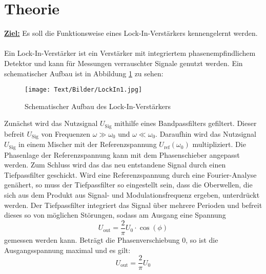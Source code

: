 \section{Theorie}

\textbf{\underline{Ziel:}}
Es soll die Funktionsweise eines Lock-In-Verstärkers kennengelernt werden.
\\
\\
Ein Lock-In-Verstärker ist ein Verstärker mit integriertem phasenempfindlichem Detektor und kann für
Messungen verrauschter Signale genutzt werden.
Ein schematischer Aufbau ist in Abbildung \ref{fig:Aufbau1} zu sehen:
\begin{figure}[H]
  \centering
  \texttt{[image: Text/Bilder/LockIn1.jpg]}
  \caption{Schematischer Aufbau des Lock-In-Verstärkers \cite[2]{sample}}
  \label{fig:Aufbau1}
\end{figure}
Zunächst wird das Nutzsignal $U_\text{Sig}$ mithilfe eines Bandpassfilters gefiltert.
Dieser befreit $U_\text{Sig}$ von Frequenzen $\omega \gg \omega_\text{0}$ und $\omega \ll \omega_\text{0}$.
Daraufhin wird das Nutzsignal $U_\text{Sig}$ in einem Mischer mit der
Referenzspannung $U_\text{ref}(\omega_\text{0})$ multipliziert.
Die Phasenlage der Referenzspannung kann mit dem Phasenschieber angepasst werden.
Zum Schluss wird das das neu entstandene Signal durch einen Tiefpassfilter geschickt.
Wird eine Referenzspannung durch eine Fourier-Analyse genähert, so muss der Tiefpassfilter so eingestellt sein, dass
die Oberwellen, die sich aus dem Produkt aus Signal- und Modulationsfrequenz ergeben, unterdrückt werden.
Der Tiefpassfilter integriert das Signal über mehrere Perioden und befreit dieses so
von möglichen Störungen, sodass am Ausgang eine
Spannung
\begin{equation}
  U_\text{out} = \frac{2}{\pi}U_\text{0}\cdot \cos{\left(\phi\right)}
  \label{eqn:Uout}
\end{equation}
gemessen werden kann.
Beträgt die Phasenverschiebung 0, so ist die Ausgangsspannung maximal und es gilt:
\begin{equation}
  U_\text{out} = \frac{2}{\pi}U_\text{0}
\end{equation}

